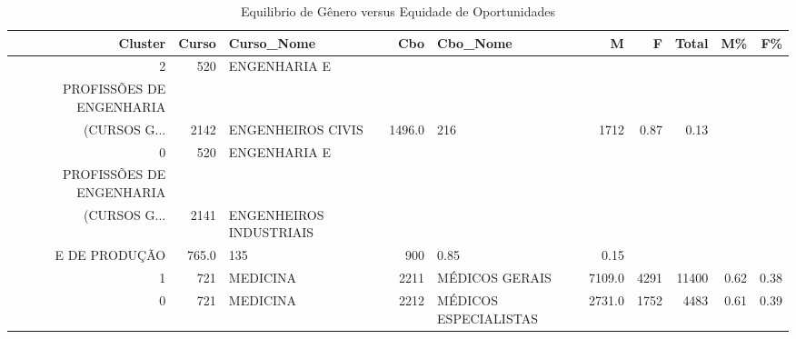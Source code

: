 \begin{table}
\centering
\caption{Equilibrio de Gênero versus Equidade de Oportunidades}
\label{tab:Salarios_Equidade}
\begin{tabular}{rrlrlrrrrr}
\toprule
 Cluster &  Curso &                                         Curso\_Nome &  Cbo &                              Cbo\_Nome &      M &    F &  Total &   M\% &   F\% \\
\midrule
       2 &    520 & ENGENHARIA E \\ PROFISSÕES DE ENGENHARIA \\ (CURSOS G... & 2142 &                    ENGENHEIROS CIVIS  & 1496.0 &  216 &   1712 & 0.87 & 0.13 \\
       0 &    520 & ENGENHARIA E \\ PROFISSÕES DE ENGENHARIA \\ (CURSOS G... & 2141 & ENGENHEIROS INDUSTRIAIS \\ E DE PRODUÇÃO &  765.0 &  135 &    900 & 0.85 & 0.15 \\
       1 &    721 &                                           MEDICINA & 2211 &                        MÉDICOS GERAIS & 7109.0 & 4291 &  11400 & 0.62 & 0.38 \\
       0 &    721 &                                           MEDICINA & 2212 &                 MÉDICOS ESPECIALISTAS & 2731.0 & 1752 &   4483 & 0.61 & 0.39 \\
\bottomrule
\end{tabular}
\end{table}
